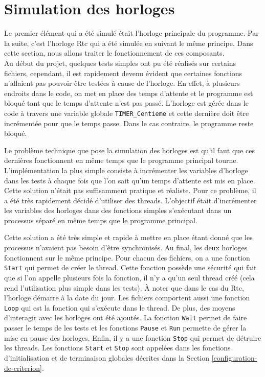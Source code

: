 \documentclass[a4paper]{article}
\begin{document}
\section{Simulation des horloges}%
\label{simuhorologes}

Le premier élément qui a été simulé était l'horloge principale du programme. Par
la suite, c'est l'horloge Rtc qui a été simulée en suivant le même principe.
Dans cette section, nous allons traiter le fonctionnement de ces composants.\\

Au début du projet, quelques tests simples ont pu été réalisés sur certains
fichiers, cependant, il est rapidement devenu évident que certaines fonctions
n'allaient pas pouvoir être testées à cause de l'horloge. En effet, à plusieurs
endroits dans le code, on met en place des temps d'attente et le programme est
bloqué tant que le temps d'attente n'est pas passé. L'horloge est gérée dans le
code à travers une variable globale \verb|TIMER_Centieme| et cette dernière
doit être incrémentée pour que le temps passe. Dans le cas contraire, le
programme reste bloqué.

Le problème technique que pose la simulation des horloges est qu'il faut que ces
dernières fonctionnent en même temps que le programme principal tourne.
L'implémentation la plus simple consiste à incrémenter les variables d'horloge
dans les tests à chaque fois que l'on sait qu'un temps d'attente est mis en
place. Cette solution n'était pas suffisamment pratique et réaliste. Pour ce
problème, il a été très rapidement décidé d'utiliser des threads. L'objectif
était d'incrémenter les variables des horloges dans des fonctions simples
s'exécutant dans un processus séparé en même temps que le programme principal.

Cette solution a été très simple et rapide à mettre en place étant donné que les
processus n'avaient pas besoin d'être synchronisés. Au final, les deux horloges
fonctionnent sur le même principe. Pour chacun des fichiers, on a une fonction
\verb|Start| qui permet de créer le thread. Cette fonction possède une sécurité
qui fait que si l'on appelle plusieurs fois la fonction, il n'y a qu'un seul
thread créé (cela rend l'utilisation plus simple dans les tests). À noter que
dans le cas du Rtc, l'horloge démarre à la date du jour. Les fichiers comportent
aussi une fonction \verb|Loop| qui est la fonction qui s'exécute dans le thread.
De plus, des moyens d'interagir avec les horloges ont été ajoutés. La fonction
\verb|Wait| permet de faire passer le temps de les tests et les fonctions
\verb|Pause| et \verb|Run| permette de gérer la mise en pause des horloges.
Enfin, il y a une fonction \verb|Stop| qui permet de détruire les threads. Les
fonctions \verb|Start| et \verb|Stop| sont appelées dans les fonctions
d'initialisation et de terminaison globales décrites dans la Section
\ref{configuration-de-criterion}.\\
\end{document}
